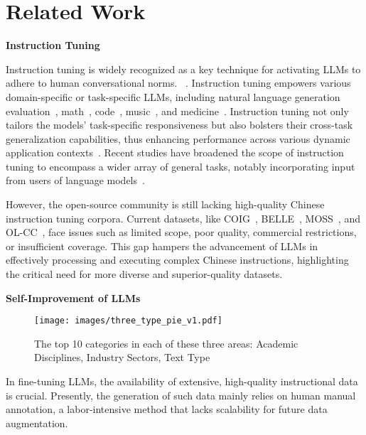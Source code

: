 \section{Related Work}

\textbf{Instruction Tuning} 

Instruction tuning is widely recognized as a key technique for activating LLMs to adhere to human conversational norms.
~\citep{naturalinstructions,supernaturalinstructions,wang2023interactive}. 
Instruction tuning empowers various domain-specific or task-specific LLMs, including natural language generation evaluation~\citep{jiang2023tigerscore}, math~\citep{yue2023mammoth,xu2023wizardlm,azerbayev2023llemma}, code~\cite{luo2023wizardcoder}, music~\cite{li2023mertech,deng2023musilingo}, and medicine~\cite{wang2023huatuo}.
Instruction tuning not only tailors the models' task-specific responsiveness but also bolsters their cross-task generalization capabilities, thus enhancing performance across various dynamic application contexts~\citep{weifinetuned,sanh2022multitask,naturalinstructions,supernaturalinstructions}.
Recent studies have broadened the scope of instruction tuning to encompass a wider array of general tasks, notably incorporating input from users of language models~\citep{ouyang2022training,peng2023instruction}.

However, the open-source community is still lacking high-quality Chinese instruction tuning corpora. Current datasets, like COIG~\citep{zhang2023chinese}, BELLE~\citep{ji2023exploring}, MOSS~\citep{sun2023moss}, and OL-CC~\citep{olcc}, face issues such as limited scope, poor quality, commercial restrictions, or insufficient coverage. This gap hampers the advancement of LLMs in effectively processing and executing complex Chinese instructions, highlighting the critical need for more diverse and superior-quality datasets.

\textbf{Self-Improvement of LLMs}

\begin{wrapfigure}{r}{0.5\textwidth}
  \centering
  \texttt{[image: images/three\_type\_pie\_v1.pdf]}
  \caption{The top 10 categories in each of these three areas: Academic Disciplines, Industry Sectors, Text Type}
  \label{fig:type}
\vspace{-0.5cm}
\end{wrapfigure}

In fine-tuning LLMs, the availability of extensive, high-quality instructional data is crucial. Presently, the generation of such data mainly relies on human manual annotation, a labor-intensive method that lacks scalability for future data augmentation. 

